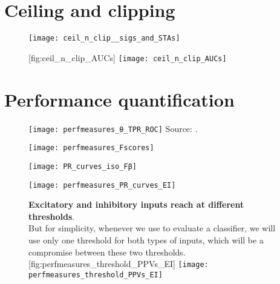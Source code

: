 \FloatBarrier
\section{Ceiling and clipping}



\begin{figure}
    \texttt{[image: ceil\_n\_clip\_\_sigs\_and\_STAs]}
    \captionn
        {}
        { }
    \label{fig:ceil_n_clip__sigs_and_STAs}
\end{figure}

\begin{figure}
    \begin{sidecaption}
        {}
        [fig:ceil_n_clip_AUCs]
        \texttt{[image: ceil\_n\_clip\_AUCs]}
    \end{sidecaption}
\end{figure}


\FloatBarrier
\section{Performance quantification}


\begin{figure}
    \texttt{[image: perfmeasures\_θ\_TPR\_ROC]}
    \captionn
    { }
    {Source: .}
    \label{fig:perfmeasures_θ_TPR_ROC}
\end{figure}

\begin{figure}
    \texttt{[image: perfmeasures\_Fscores]}
    \captionn
        {}
        {}
    \label{fig:perfmeasures_Fscores}
\end{figure}

\begin{figure}
    \texttt{[image: PR\_curves\_iso\_Fβ]}
    \captionn
        { }
        {}
    \label{fig:PR_curves_iso_Fβ}
\end{figure}

\begin{figure}
    \texttt{[image: perfmeasures\_PR\_curves\_EI]}
    \captionn
        {}
        {}
    \label{fig:perfmeasures_PR_curves_EI}
\end{figure}

\begin{figure}
    \begin{sidecaption}
        {\textbf{Excitatory and inhibitory inputs reach \maxF at different thresholds}.\\
        But for simplicity, whenever we use \maxF to evaluate a classifier, we will use only one threshold for both types of inputs, which will be a compromise between these two thresholds.}
        [fig:perfmeasures_threshold_PPVs_EI]
        \texttt{[image: perfmeasures\_threshold\_PPVs\_EI]}
    \end{sidecaption}
\end{figure}

